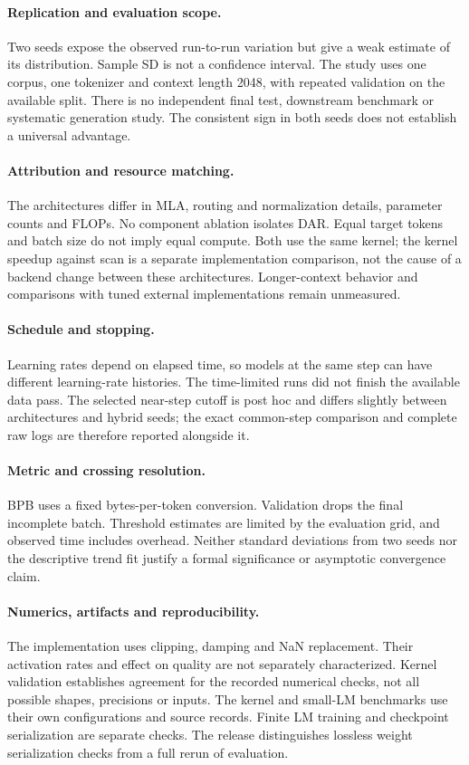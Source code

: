 \documentclass[10pt,a4paper]{article}
\begin{document}
\paragraph{Replication and evaluation scope.}
Two seeds expose the observed run-to-run variation but give a weak estimate of its
distribution. Sample SD is not a confidence interval. The study uses one corpus,
one tokenizer and context length 2048, with repeated validation on the available split.
There is no independent final test, downstream benchmark or systematic generation study.
The consistent sign in both seeds does not establish a universal advantage.

\paragraph{Attribution and resource matching.}
The architectures differ in MLA, routing and normalization details, parameter counts
and FLOPs. No component ablation isolates DAR. Equal target tokens and batch size do
not imply equal compute. Both use the same kernel; the kernel speedup against scan is a separate
implementation comparison, not the cause of a backend change between these architectures. Longer-context behavior and
comparisons with tuned external implementations remain unmeasured.

\paragraph{Schedule and stopping.}
Learning rates depend on elapsed time, so models at the same step can have different
learning-rate histories. The time-limited runs did not finish the available data pass.
The selected near-step cutoff is post hoc and differs slightly between architectures
and hybrid seeds; the exact common-step comparison and complete raw logs are therefore
reported alongside it.

\paragraph{Metric and crossing resolution.}
BPB uses a fixed bytes-per-token conversion. Validation drops the final incomplete batch.
Threshold estimates are limited by the evaluation grid, and observed time includes overhead.
Neither standard deviations from two seeds nor the descriptive trend fit justify a
formal significance or asymptotic convergence claim.

\paragraph{Numerics, artifacts and reproducibility.}
The implementation uses clipping, damping and NaN replacement. Their activation rates
and effect on quality are not separately characterized. Kernel validation establishes agreement for the recorded numerical checks, not all possible
shapes, precisions or inputs. The kernel and small-LM benchmarks use their own configurations
and source records. Finite LM training and checkpoint serialization are separate checks. The release distinguishes
lossless weight serialization checks from a full rerun of evaluation.
\end{document}
